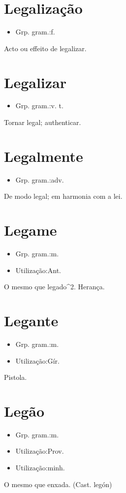 \section{Legalização}
\begin{itemize}
\item {Grp. gram.:f.}
\end{itemize}
Acto ou effeito de legalizar.
\section{Legalizar}
\begin{itemize}
\item {Grp. gram.:v. t.}
\end{itemize}
Tornar legal; authenticar.
\section{Legalmente}
\begin{itemize}
\item {Grp. gram.:adv.}
\end{itemize}
De modo legal; em harmonia com a lei.
\section{Legame}
\begin{itemize}
\item {Grp. gram.:m.}
\end{itemize}
\begin{itemize}
\item {Utilização:Ant.}
\end{itemize}
O mesmo que \textunderscore legado\textunderscore ^2.
Herança.
\section{Legante}
\begin{itemize}
\item {Grp. gram.:m.}
\end{itemize}
\begin{itemize}
\item {Utilização:Gír.}
\end{itemize}
Pistola.
\section{Legão}
\begin{itemize}
\item {Grp. gram.:m.}
\end{itemize}
\begin{itemize}
\item {Utilização:Prov.}
\end{itemize}
\begin{itemize}
\item {Utilização:minh.}
\end{itemize}
O mesmo que \textunderscore enxada\textunderscore .
(Cast. \textunderscore legón\textunderscore )
